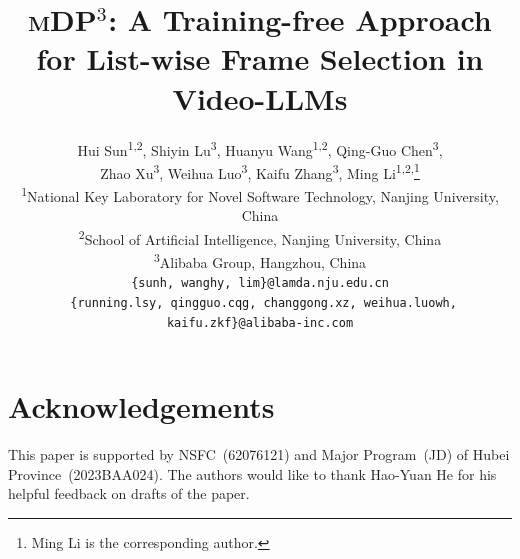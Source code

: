 \documentclass[10pt,twocolumn,letterpaper]{article}
\title{\textsc{mDP$^3$}: A Training-free Approach for List-wise Frame Selection in Video-LLMs}
\author{
Hui Sun\textsuperscript{1,2}, Shiyin Lu\textsuperscript{3}, Huanyu Wang\textsuperscript{1,2}, Qing-Guo Chen\textsuperscript{3}, \\
Zhao Xu\textsuperscript{3}, Weihua Luo\textsuperscript{3}, Kaifu Zhang\textsuperscript{3}, Ming Li\textsuperscript{1,2,}\thanks{Ming Li is the corresponding author.} \\
\textsuperscript{1}National Key Laboratory for Novel Software Technology, Nanjing University, China \\
\textsuperscript{2}School of Artificial Intelligence, Nanjing University, China \\
\textsuperscript{3}Alibaba Group, Hangzhou, China \\
{\tt\small 
	\{sunh, wanghy, lim\}@lamda.nju.edu.cn
} \\
{\tt\small 
	\{running.lsy, qingguo.cqg, changgong.xz, weihua.luowh, kaifu.zkf\}@alibaba-inc.com}
}
\begin{document}
\maketitle







\section*{Acknowledgements}
This paper is supported by NSFC~(62076121)
and Major Program~(JD) of Hubei Province~(2023BAA024).
The authors would like to thank Hao-Yuan He for his helpful feedback on drafts of the paper.

{
    \small
    
    
}

\end{document}

